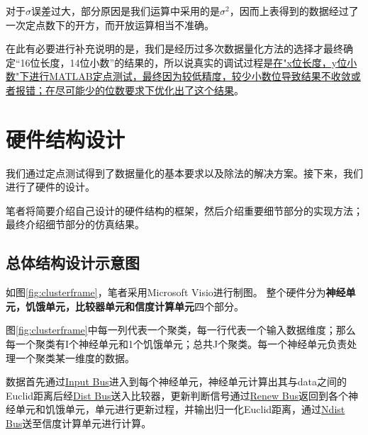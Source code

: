 对于$\sigma$误差过大，部分原因是我们运算中采用的是$\sigma^2$，因而上表得到的数据经过了一次定点数下的开方，而开放运算相当不准确。

在此有必要进行补充说明的是，我们是经历过多次数据量化方法的选择才最终确定“16位长度，14位小数”的结果的，所以说真实的调试过程是\uline{在"x位长度，y位小数"下进行MATLAB定点测试，最终因为较低精度，较少小数位导致结果不收敛或者报错；在尽可能少的位数要求下优化出了这个结果}。


\section{硬件结构设计}

我们通过定点测试得到了数据量化的基本要求以及除法的解决方案。接下来，我们进行了硬件的设计。

笔者将简要介绍自己设计的硬件结构的框架，然后介绍重要细节部分的实现方法；最终介绍细节部分的仿真结果。

\subsection{总体结构设计示意图}

如图\ref{fig:clusterframe}，笔者采用Microsoft Visio进行制图。 整个硬件分为\textbf{神经单元，饥饿单元，比较器单元和信度计算单元}四个部分。

图\ref{fig:clusterframe}中每一列代表一个聚类，每一行代表一个输入数据维度；那么每一个聚类有I个神经单元和1个饥饿单元；总共J个聚类。每一个神经单元负责处理一个聚类某一维度的数据。

数据首先通过\uline{Input Bus}进入到每个神经单元，神经单元计算出其与data之间的Euclid距离后经\uline{Dist Bus}送入比较器，更新判断信号通过\uline{Renew Bus}返回到各个神经单元和饥饿单元，单元进行更新过程，并输出归一化Euclid距离，通过\uline{Ndist Bus}送至信度计算单元进行计算。

